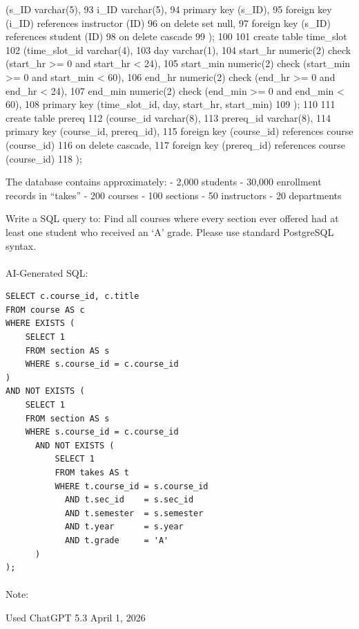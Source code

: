 \documentclass[
  letterpaper,
  DIV=11,
  numbers=noendperiod]{scrartcl}
\makeatletter
\let\oldparagraph\paragraph
\renewcommand{\paragraph}{
    \@ifstar
      \xxxParagraphStar
      \xxxParagraphNoStar
  }
\newcommand{\xxxParagraphStar}[1]{\oldparagraph*{#1}\mbox{}}
\newcommand{\xxxParagraphNoStar}[1]{\oldparagraph{#1}\mbox{}}
\makeatother
\begin{document}
(s\_ID varchar(5), 93 i\_ID varchar(5), 94 primary key (s\_ID), 95
foreign key (i\_ID) references instructor (ID) 96 on delete set null, 97
foreign key (s\_ID) references student (ID) 98 on delete cascade 99 );
100 101 create table time\_slot 102 (time\_slot\_id varchar(4), 103 day
varchar(1), 104 start\_hr numeric(2) check (start\_hr \textgreater= 0
and start\_hr \textless{} 24), 105 start\_min numeric(2) check
(start\_min \textgreater= 0 and start\_min \textless{} 60), 106 end\_hr
numeric(2) check (end\_hr \textgreater= 0 and end\_hr \textless{} 24),
107 end\_min numeric(2) check (end\_min \textgreater= 0 and end\_min
\textless{} 60), 108 primary key (time\_slot\_id, day, start\_hr,
start\_min) 109 ); 110 111 create table prereq 112 (course\_id
varchar(8), 113 prereq\_id varchar(8), 114 primary key (course\_id,
prereq\_id), 115 foreign key (course\_id) references course (course\_id)
116 on delete cascade, 117 foreign key (prereq\_id) references course
(course\_id) 118 );

The database contains approximately: - 2,000 students - 30,000
enrollment records in ``takes'' - 200 courses - 100 sections - 50
instructors - 20 departments

Write a SQL query to: Find all courses where every section ever offered
had at least one student who received an `A' grade. Please use standard
PostgreSQL syntax.

\paragraph{AI-Generated SQL:}\label{ai-generated-sql-2}

\begin{verbatim}
SELECT c.course_id, c.title
FROM course AS c
WHERE EXISTS (
    SELECT 1
    FROM section AS s
    WHERE s.course_id = c.course_id
)
AND NOT EXISTS (
    SELECT 1
    FROM section AS s
    WHERE s.course_id = c.course_id
      AND NOT EXISTS (
          SELECT 1
          FROM takes AS t
          WHERE t.course_id = s.course_id
            AND t.sec_id    = s.sec_id
            AND t.semester  = s.semester
            AND t.year      = s.year
            AND t.grade     = 'A'
      )
);
\end{verbatim}

\paragraph{Note:}\label{note-2}

Used ChatGPT 5.3 April 1, 2026
\end{document}
